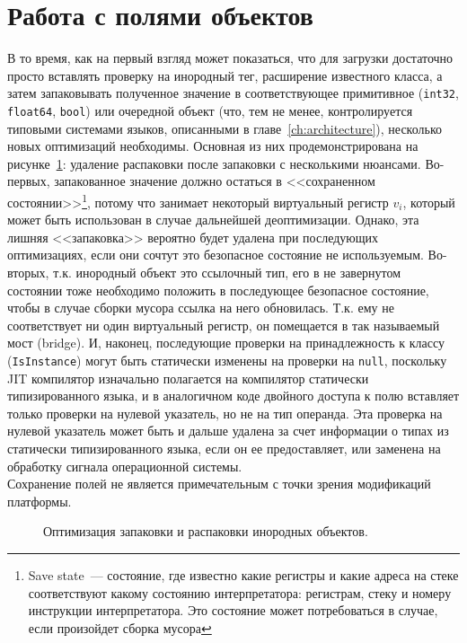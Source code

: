 \documentclass[times
,titlepage
]{itmo-student-thesis}
\begin{document}
\section{Работа с полями объектов}\label{ch:work-with-fields}
В то время, как на первый взгляд может показаться, что для загрузки достаточно просто вставлять проверку на инородный тег, расширение известного класса, а затем запаковывать полученное значение в соответствующее примитивное (\texttt{int32}, \texttt{float64}, \texttt{bool}) или очередной объект (что, тем не менее, контролируется типовыми системами языков, описанными в главе~\ref{ch:architecture}), несколько новых оптимизаций необходимы. Основная из них продемонстрирована на рисунке~\ref{fig:field-opt}: удаление распаковки после запаковки с несколькими нюансами. Во-первых, запакованное значение должно остаться в <<сохраненном состоянии>>\footnote{Save state~--- состояние, где известно какие регистры и какие адреса на стеке соответствуют какому состоянию интерпретатора: регистрам, стеку и номеру инструкции интерпретатора. Это состояние может потребоваться в случае, если произойдет сборка мусора}, потому что занимает некоторый виртуальный регистр $v_i$, который может быть использован в случае дальнейшей деоптимизации. Однако, эта лишняя <<запаковка>> вероятно будет удалена при последующих оптимизациях, если они сочтут это безопасное состояние не используемым. Во-вторых, т.к. инородный объект это ссылочный тип, его в не завернутом состоянии тоже необходимо положить в последующее безопасное состояние, чтобы в случае сборки мусора ссылка на него обновилась. Т.к. ему не соответствует ни один виртуальный регистр, он помещается в так называемый мост (bridge). И, наконец, последующие проверки на принадлежность к классу (\texttt{IsInstance}) могут быть статически изменены на проверки на \texttt{null}, поскольку JIT компилятор изначально полагается на компилятор статически типизированного языка, и в аналогичном коде двойного доступа к полю вставляет только проверки на нулевой указатель, но не на тип операнда. Эта проверка на нулевой указатель может быть и дальше удалена за счет информации о типах из статически типизированного языка, если он ее предоставляет, или заменена на обработку сигнала операционной системы.\\
Сохранение полей не является примечательным с точки зрения модификаций платформы.

\begin{figure}[!h]
	\caption{Оптимизация запаковки и распаковки инородных объектов.}\label{fig:field-opt}
	\centering
	\end{figure}
\end{document}

